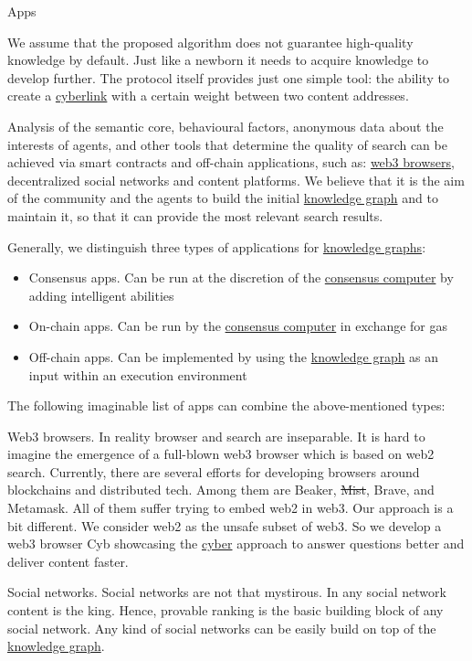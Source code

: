\documentclass[8pt,oneside]{amsart}
\makeatletter
\renewcommand\subsection{\@startsection{subsection}
                                    {2}{\z@}
                                    {-3.25ex\@plus -1ex \@minus -.2ex}
                                    {0ex \@plus .2ex}
                                    {\play\Large}
                        }
\newcommand{\titleSection}[1]{\subsection{#1}}
\makeatother
\begin{document}
\titleSection{Apps}\label{apps}

We assume that the proposed algorithm does not guarantee high-quality knowledge by default. Just like a newborn it needs to acquire knowledge to develop further. The protocol itself provides just one simple tool: the ability to create a {\hyperref[cyberlinks]{cyberlink}} with a certain weight between two content addresses.

Analysis of the semantic core, behavioural factors, anonymous data about the interests of agents, and other tools that determine the quality of search can be achieved via smart contracts and off-chain applications, such as: {\hyperref[browzers]{web3 browsers}}, decentralized social networks and content platforms. We believe that it is the aim of the community and the agents to build the initial {\hyperref[knowledge-graph]{knowledge graph}} and to maintain it, so that it can provide the most relevant search results.

Generally, we distinguish three types of applications for {\hyperref[knowledge-graph]{knowledge graphs}}:

\begin{itemize}
\item Consensus apps. Can be run at the discretion of the {\hyperref[consensus-computer]{consensus computer}} by adding intelligent abilities
\item On-chain apps. Can be run by the {\hyperref[consensus-computer]{consensus computer}} in exchange for gas
\item Off-chain apps. Can be implemented by using the {\hyperref[knowledge-graph]{knowledge graph}} as an input within an execution environment
\end{itemize}

The following imaginable list of apps can combine the above-mentioned types:

Web3 browsers. In reality browser and search are inseparable. It is hard to imagine the emergence of a full-blown web3 browser which is based on web2 search. Currently, there are several efforts for developing browsers around blockchains and distributed tech. Among them are Beaker, \sout{Mist}, Brave, and Metamask. All of them suffer trying to embed web2 in web3. Our approach is a bit different. We consider web2 as the unsafe subset of web3. So we develop a web3 browser Cyb showcasing the {\hyperref[cyber]{cyber}} approach to answer questions better and deliver content faster.

Social networks. Social networks are not that mystirous. In any social network content is the king. Hence, provable ranking is the basic building block of any social network. Any kind of social networks can be easily build on top of the {\hyperref[knowledge-graph]{knowledge graph}}.
\end{document}
